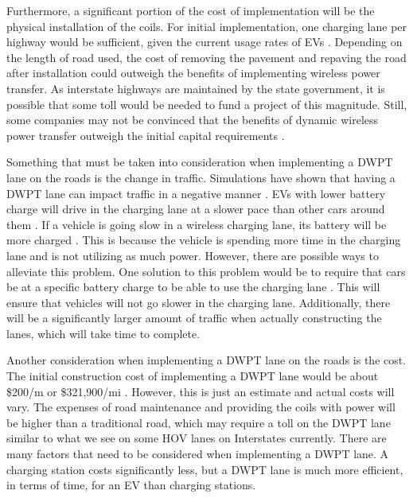 Furthermore, a significant portion of the cost of implementation will be the physical installation of the coils. 
For initial implementation, one charging lane per highway would be sufficient, given the current usage rates of 
EVs \cite{li_longitudinal_2018}. Depending on the length of road used, the cost of removing the pavement and repaving the 
road after installation could outweigh the benefits of implementing wireless power transfer. As interstate 
highways are maintained by the state government, it is possible that some toll would be needed to fund a project 
of this magnitude. Still, some companies may not be convinced that the benefits of dynamic wireless power transfer 
outweigh the initial capital requirements \cite{chen_lightweight_2013}. 

Something that must be taken into consideration when implementing a DWPT lane on the roads is the change in traffic. 
Simulations have shown that having a DWPT lane can impact traffic in a negative manner \cite{li_longitudinal_2018}. EVs with 
lower battery charge will drive in the charging lane at a slower pace than other cars around them \cite{li_longitudinal_2018}. 
If a vehicle is going slow in a wireless charging lane, its battery will be more charged \cite{li_longitudinal_2018}. 
This is because the vehicle is spending more time in the charging lane and is not utilizing as much power. 
However, there are possible ways to alleviate this problem. One solution to this problem would be to require 
that cars be at a specific battery charge to be able to use the charging lane \cite{li_longitudinal_2018}. 
This will ensure that vehicles will not go slower in the charging lane. Additionally, there will be a significantly 
larger amount of traffic when actually constructing the lanes, which will take time to complete.

Another consideration when implementing a DWPT lane on the roads is the cost. The initial construction cost of 
implementing a DWPT lane would be about \$200/m or \$321,900/mi \cite{chen_lightweight_2013}. However, this is just an 
estimate and actual costs will vary. The expenses of road maintenance and providing the coils with power will be 
higher than a traditional road, which may require a toll on the DWPT lane similar to what we see on some HOV lanes 
on Interstates currently. There are many factors that need to be considered when implementing a DWPT lane. 
A charging station costs significantly less, but a DWPT lane is much more efficient, in terms of time, 
for an EV than charging stations. 

